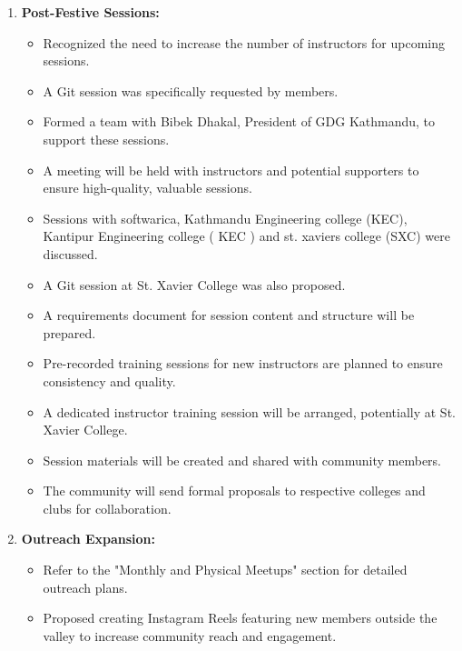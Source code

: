 \documentclass[a4paper,11pt]{article}
\begin{document}
\begin{enumerate}[label=\arabic*.]
    \item \textbf{Post-Festive Sessions:} \\
    \begin{itemize}
        \item Recognized the need to increase the number of instructors for upcoming sessions.
        \item A Git session was specifically requested by members.
        \item Formed a team with Bibek Dhakal, President of GDG Kathmandu, to support these sessions.
        \item A meeting will be held with instructors and potential supporters to ensure high-quality, valuable sessions.
        \item Sessions with softwarica, Kathmandu Engineering college (KEC), Kantipur Engineering college ( KEC ) and st. xaviers college (SXC) were discussed.
        \item A Git session at St. Xavier College was also proposed.
        \item A requirements document for session content and structure will be prepared.
        \item Pre-recorded training sessions for new instructors are planned to ensure consistency and quality.
        \item A dedicated instructor training session will be arranged, potentially at St. Xavier College.
        \item Session materials will be created and shared with community members.
        \item The community will send formal proposals to respective colleges and clubs for collaboration.
    \end{itemize}

    \item \textbf{Outreach Expansion:} \\
    \begin{itemize}
        \item Refer to the "Monthly and Physical Meetups" section for detailed outreach plans.
        \item Proposed creating Instagram Reels featuring new members outside the valley to increase community reach and engagement.
    \end{itemize}


\end{enumerate}
\end{document}
